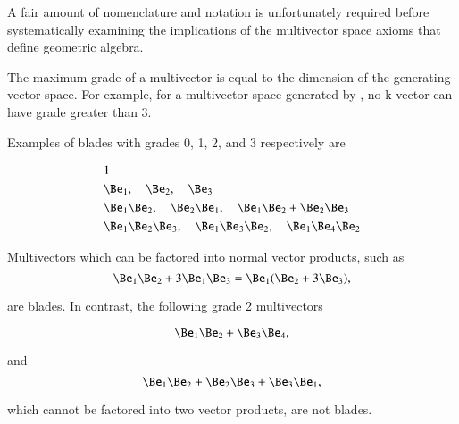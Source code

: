 %
%
A fair amount of nomenclature and notation is unfortunately required before systematically examining the implications of the multivector space axioms that define geometric algebra.


The maximum grade of a multivector is equal to the dimension of the generating vector space.
For example, for a multivector space generated by , no k-vector can have grade greater than 3.

Examples of blades with grades 0, 1, 2, and 3 respectively are

\begin{dmath}\label{eqn:multivector:180}
\begin{aligned}
&1 \\
&\Be_1,\quad \Be_2,\quad \Be_3 \\
&\Be_1 \Be_2,\quad \Be_2 \Be_1,\quad \Be_1 \Be_2 + \Be_2 \Be_3 \\
&\Be_1 \Be_2 \Be_3,\quad \Be_1 \Be_3 \Be_2,\quad \Be_1 \Be_4 \Be_2
\end{aligned}
\end{dmath}

Multivectors which can be factored into normal vector products, such as
\begin{dmath}\label{eqn:multiplication:220}
\Be_1 \Be_2 + 3 \Be_1 \Be_3
=
\Be_1 (\Be_2 + 3 \Be_3),
\end{dmath}

are blades.
In contrast, the following grade 2 multivectors

\begin{dmath}\label{eqn:multiplication:240}
\Be_1 \Be_2 + \Be_3 \Be_4,
\end{dmath}

and
\begin{dmath}\label{eqn:multiplication:260}
\Be_1 \Be_2 + \Be_2 \Be_3 + \Be_3 \Be_1,
\end{dmath}

which cannot be factored into two vector products, are not blades.

